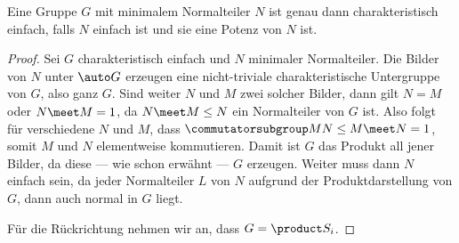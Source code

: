 \begin{theorem}
    Eine Gruppe $G$ mit minimalem Normalteiler $N$ ist genau dann charakteristisch einfach, falls $N$ einfach ist und sie eine Potenz von $N$ ist.
\end{theorem}

\begin{proof}
    Sei $G$ charakteristisch einfach und $N$ minimaler Normalteiler. Die Bilder von $N$ unter $\auto G$ erzeugen eine nicht-triviale
    charakteristische Untergruppe von $G$, also ganz $G$. Sind weiter $N$ und $M$ zwei solcher Bilder, dann gilt $N = M$ oder
    $N\meet M = 1$, da $N\meet M\leq N$ ein Normalteiler von $G$ ist. Also folgt für verschiedene $N$ und $M$, dass
    $\commutatorsubgroup M N \leq M\meet N = 1$, somit $M$ und $N$ elementweise kommutieren. Damit ist $G$ das Produkt all
    jener Bilder, da diese --- wie schon erwähnt --- $G$ erzeugen. Weiter muss dann $N$ einfach sein, da jeder Normalteiler $L$ von
    $N$ aufgrund der Produktdarstellung von $G$, dann auch normal in $G$ liegt.

    Für die Rückrichtung nehmen wir an, dass $G = \product S_i$.
\end{proof}



